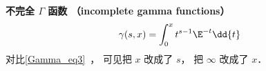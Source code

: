 

\textbf{不完全 $\Gamma$ 函数 （incomplete gamma functions）}
\begin{equation}
\gamma(s, x) = \int_0^x t^{s-1}\E^{-t} \dd{t}
\end{equation}
对比\autoref{Gamma_eq3}~， 可见把 $x$ 改成了 $s$， 把 $\infty$ 改成了 $x$．
